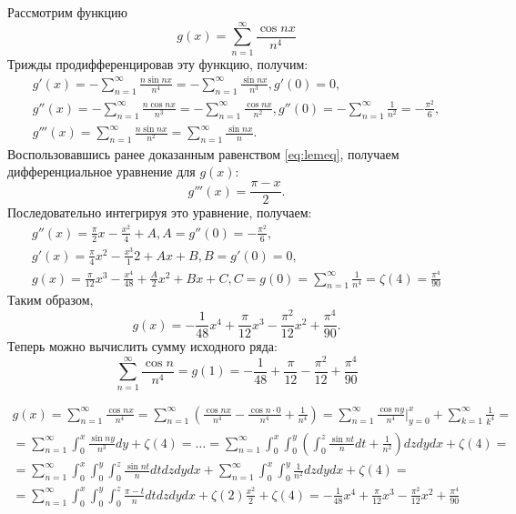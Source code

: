\documentclass[11pt]{article}
\newcounter{lem}\setcounter{lem}{0}
\newcounter{th}\setcounter{th}{0}
\begin{document}
Рассмотрим функцию
\begin{equation*}
g(x) = \sum_{n = 1}^{\infty}\frac{\cos nx}{n^4}
\end{equation*}
Трижды продифференцировав эту функцию, получим:
\begin{gather*}
g'(x) = -\sum_{n = 1}^{\infty}\frac{n\sin nx}{n^4} = -\sum_{n = 1}^{\infty}\frac{\sin nx}{n^3}, g'(0) = 0, \\
g''(x) = -\sum_{n = 1}^{\infty}\frac{n\cos nx}{n^3} = -\sum_{n = 1}^{\infty}\frac{\cos nx}{n^2}, g''(0) = -\sum_{n = 1}^{\infty}\frac1{n^2} = -\frac{\pi^2}6, \\
g'''(x) = \sum_{n = 1}^{\infty}\frac{n\sin nx}{n^2} = \sum_{n = 1}^{\infty}\frac{\sin nx}n.
\end{gather*}
Воспользовавшись ранее доказанным равенством \eqref{eq:lemeq}, получаем дифференциальное уравнение для $g(x)$:
\begin{equation*}
g'''(x) = \frac{\pi - x}2.
\end{equation*}
Последовательно интегрируя это уравнение, получаем:
\begin{gather*}
g''(x) = \frac{\pi}2x - \frac{x^2}4 + A, A = g''(0) = -\frac{\pi^2}6, \\
g'(x) = \frac{\pi}4x^2 - \frac{x^3}12 + Ax + B, B = g'(0) = 0, \\
g(x) = \frac{\pi}{12}x^3 - \frac{x^4}{48} + \frac{A}2x^2 + Bx + C, C = g(0) = \sum_{n = 1}^{\infty}\frac1{n^4} = \zeta(4) = \frac{\pi^4}{90}
\end{gather*}
Таким образом,
\begin{equation*}
g(x) = -\frac1{48}x^4 + \frac{\pi}{12}x^3 - \frac{\pi^2}{12}x^2 + \frac{\pi^4}{90}.
\end{equation*}
Теперь можно вычислить сумму исходного ряда:
\begin{equation*}
\sum_{n = 1}^{\infty}\frac{\cos n}{n^4} = g(1) = -\frac1{48} + \frac{\pi}{12} - \frac{\pi^2}{12} + \frac{\pi^4}{90}
\end{equation*}

\begin{multline*}
g(x) = \sum_{n = 1}^{\infty}\frac{\cos nx}{n^4} = \sum_{n = 1}^{\infty}\left(\frac{\cos nx}{n^4} - \frac{\cos n\cdot 0}{n^4} + \frac1{n^4}\right) = \sum_{n = 1}^{\infty}\frac{\cos ny}{n^4}\bigg|_{y = 0}^x + \sum_{k = 1}^{\infty}\frac1{k^4} = \\
= \sum_{n = 1}^{\infty}\int_0^x\frac{\sin ny}{n^3}dy + \zeta(4) = \ldots = \sum_{n = 1}^{\infty}\int_0^x\int_0^y\left(\int_0^z\frac{\sin nt}ndt + \frac1{n^2}\right)dzdydx + \zeta(4) = \\
= \sum_{n = 1}^{\infty}\int_0^x\int_0^y\int_0^z\frac{\sin nt}ndtdzdydx + \sum_{n = 1}^{\infty}\int_0^x\int_0^y\frac1{n^2}dzdydx + \zeta(4) = \\
= \sum_{n = 1}^{\infty}\int_0^x\int_0^y\int_0^z\frac{\pi - t}ndtdzdydx + \zeta(2)\frac{x^2}2 + \zeta(4) = -\frac1{48}x^4 + \frac{\pi}{12}x^3 - \frac{\pi^2}{12}x^2 + \frac{\pi^4}{90}
\end{multline*}
\pagebreak
\end{document}
